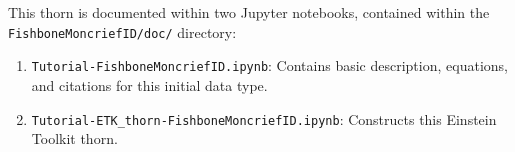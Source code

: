\documentclass{article}
\begin{document}
%
% 
%
%
%
%






This thorn is documented within two Jupyter notebooks, contained
within the \verb|FishboneMoncriefID/doc/| directory:

\begin{enumerate}
\item \verb|Tutorial-FishboneMoncriefID.ipynb|: Contains basic
  description, equations, and citations for this initial data type.
\item \verb|Tutorial-ETK_thorn-FishboneMoncriefID.ipynb|: Constructs
  this Einstein Toolkit thorn.
\end{enumerate}
\end{document}
